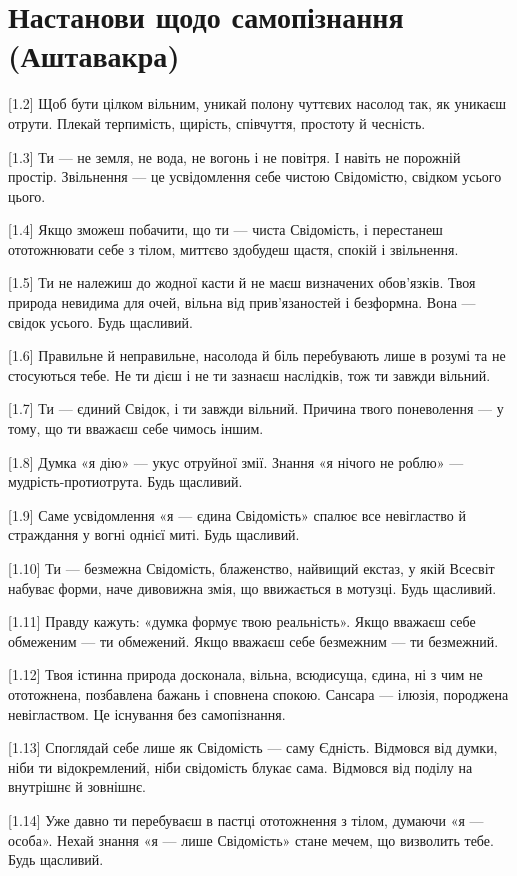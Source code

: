 \chapter[Аштавакра]{Настанови щодо самопізнання (Аштавакра)}

[1.2] Щоб бути цілком вільним, уникай полону чуттєвих насолод так, як уникаєш отрути. Плекай терпимість, щирість, співчуття, простоту й чесність.

[1.3] Ти --- не земля, не вода, не вогонь і не повітря. І навіть не порожній простір. Звільнення --- це усвідомлення себе чистою Свідомістю, свідком усього цього.

[1.4] Якщо зможеш побачити, що ти --- чиста Свідомість, і перестанеш ототожнювати себе з тілом, миттєво здобудеш щастя, спокій і звільнення.

[1.5] Ти не належиш до жодної касти й не маєш визначених обов'язків. Твоя природа невидима для очей, вільна від прив'язаностей і безформна. Вона --- свідок усього. Будь щасливий.

[1.6] Правильне й неправильне, насолода й біль перебувають лише в розумі та не стосуються тебе. Не ти дієш і не ти зазнаєш наслідків, тож ти завжди вільний.

[1.7] Ти --- єдиний Свідок, і ти завжди вільний. Причина твого поневолення --- у тому, що ти вважаєш себе чимось іншим.

[1.8] Думка «я дію» --- укус отруйної змії. Знання «я нічого не роблю» --- мудрість-протиотрута. Будь щасливий.

[1.9] Саме усвідомлення «я --- єдина Свідомість» спалює все невігластво й страждання у вогні однієї миті. Будь щасливий.

[1.10] Ти --- безмежна Свідомість, блаженство, найвищий екстаз, у якій Всесвіт набуває форми, наче дивовижна змія, що ввижається в мотузці. Будь щасливий.

[1.11] Правду кажуть: «думка формує твою реальність». Якщо вважаєш себе обмеженим --- ти обмежений. Якщо вважаєш себе безмежним --- ти безмежний.

[1.12] Твоя істинна природа досконала, вільна, всюдисуща, єдина, ні з чим не ототожнена, позбавлена бажань і сповнена спокою. Сансара --- ілюзія, породжена невіглаством. Це існування без самопізнання.

[1.13] Споглядай себе лише як Свідомість --- саму Єдність. Відмовся від думки, ніби ти відокремлений, ніби свідомість блукає сама. Відмовся від поділу на внутрішнє й зовнішнє.

[1.14] Уже давно ти перебуваєш в пастці ототожнення з тілом, думаючи «я --- особа». Нехай знання «я --- лише Свідомість» стане мечем, що визволить тебе. Будь щасливий.

